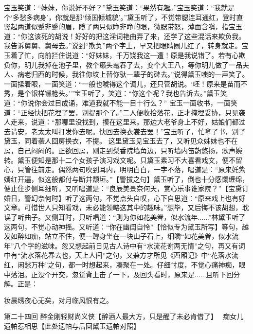 \documentclass[12pt,oneside]{book}
\begin{document}
宝玉笑道：“妹妹，你说好不好？”黛玉笑道：“果然有趣。”宝玉笑道：“我就是个‘多愁多病身’，你就是那‘倾国倾城貌’。”黛玉听了，不觉带腮连耳通红，登时直竖起两道似蹙非蹙的眉，瞪了两只似睁非睁的眼，微腮带怒，薄面含嗔，指宝玉道：“你这该死的胡说！好好的把这淫词艳曲弄了来，还学了这些混话来欺负我。我告诉舅舅、舅母去。”说到“欺负”两个字上，早又把眼睛圈儿红了，转身就走。宝玉着了忙，向前拦住说道：“好妹妹，千万饶我这一遭！原是我说错了。若有心欺负你，明儿我掉在池子里，教个癞头鼋吞了去，变个大王八，等你明儿做了一品夫人、病老归西的时候，我往你坟上替你驮一辈子的碑去。”说得黛玉嗤的一声笑了。一面揉着眼，一面笑道：“一般也唬得这个调儿，还只管胡说。‘呸！原来是苗而不秀，是个银样镴枪头。’”宝玉听了，笑道：“你这个呢？我也告诉去。”黛玉笑道：“你说你会过目成诵，难道我就不能一目十行么？”
宝玉一面收书，一面笑道：“正经快把花埋了罢，别提那个了。”二人便收拾落花，正才掩埋妥协，只见袭人走来，说道：“那哪里没找到，摸在这里来。那边大老爷身上不好，姑娘们都过去请安，老太太叫打发你去呢。快回去换衣裳去罢！”宝玉听了，忙拿了书，别了黛玉，同着袭人回房换衣，不提。
这里黛玉见宝玉去了，又听见众姊妹也不在房，自己闷闷的。正欲回房，刚走到梨香院墙角边，只听墙内笛韵悠扬，歌声婉转。黛玉便知是那十二个女孩子演习戏文呢。只黛玉素习不大喜看戏文，便不留心，只管往前走。偶然两句吹到耳内，明明白白，一字不落，唱道是：“原来奼紫嫣红开遍，似这般都付与断井颓垣。”【警拔之句】黛玉听了，倒也十分感慨缠绵，便止住步侧耳细听，又听唱道是：“良辰美景奈何天，赏心乐事谁家院？”【宝黛订婚日，警幻奈何时】听了这两句，不觉点头自叹，心下自思道：“原来戏上也有好文章。可惜世人只知看戏，未必能领略这其中的趣味。”想毕，又后悔不该胡想，耽误了听曲子。又侧耳时，只听唱道：“则为你如花美眷，似水流年......”林黛玉听了这两句，不觉心动神摇。又听道：“你在幽闺自怜”【恰似专为黛玉所写】等句，越发如醉如痴，站立不住，便一蹲身坐在一块山子石上，细嚼“如花美眷，似水流年”八个字的滋味。忽又想起前日见古人诗中有“水流花谢两无情”之句，再又有词中有“流水落花春去也，天上人间”之句，又兼方才所见《西厢记》中“花落水流红，闲愁万种”之句，都一时想起来，凑聚在一处。仔细忖度，不觉心痛神痴，眼中落泪。正没个开交，忽觉背上击了一下，及回头看时，原来是......且听下回分解。正是：

妆晨绣夜心无矣，对月临风恨有之。

 
第二十四回  醉金刚轻财尚义侠【醉酒人最大方，只是醒了未必肯借了】　
痴女儿遗帕惹相思【此处遗帕与后回黛玉遗帕对照】
\end{document}
